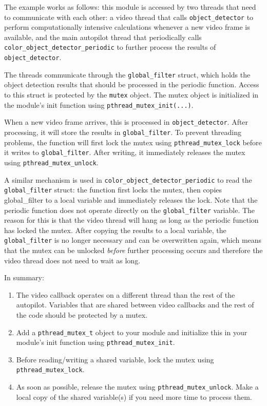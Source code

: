 \documentclass{article}
\begin{document}
The example works as follows: this module is accessed by two threads that need to communicate with each other: a video thread that calls \texttt{object\_detector} to perform computationally intensive calculations whenever a new video frame is available, and the main autopilot thread that periodically calls \texttt{color\_object\_detector\_periodic} to further process the results of \texttt{object\_detector}.

The threads communicate through the \texttt{global\_filter} struct, which holds the object detection results that should be processed in the periodic function. Access to this struct is protected by the \texttt{mutex} object. The mutex object is initialized in the module's init function using \texttt{pthread\_mutex\_init(...)}.

When a new video frame arrives, this is processed in \texttt{object\_detector}. After processing, it will store the results in \texttt{global\_filter}. To prevent threading problems, the function will first lock the mutex using \texttt{pthread\_mutex\_lock} before it writes to \texttt{global\_filter}. After writing, it immediately releases the mutex using \texttt{pthread\_mutex\_unlock}.

A similar mechanism is used in \texttt{color\_object\_detector\_periodic} to read the \texttt{global\_filter} struct: the function first locks the mutex, then copies global\_filter to a local variable and immediately releases the lock.
Note that the periodic function does not operate directly on the \texttt{global\_filter} variable. The reason for this is that the video thread will hang as long as the periodic function has locked the mutex. After copying the results to a local variable, the \texttt{global\_filter} is no longer necessary and can be overwritten again, which means that the mutex can be unlocked \emph{before} further processing occurs and therefore the video thread does not need to wait as long.

In summary:
\begin{enumerate}
\item The video callback operates on a different thread than the rest of the autopilot. Variables that are shared between video callbacks and the rest of the code should be protected by a mutex.
\item Add a \texttt{pthread\_mutex\_t} object to your module and initialize this in your module's init function using \texttt{pthread\_mutex\_init}.
\item Before reading/writing a shared variable, lock the mutex using \texttt{pthread\_mutex\_lock}.
\item As soon as possible, release the mutex using \texttt{pthread\_mutex\_unlock}. Make a local copy of the shared variable(s) if you need more time to process them.
\end{enumerate}
\end{document}
